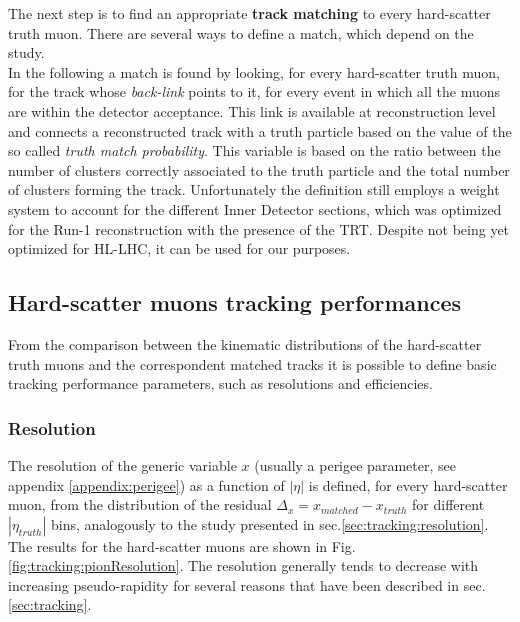 \documentclass[a4paper,twoside,12pt]{article}
\begin{document}
The next step is to find an appropriate \textbf{track matching} to every hard-scatter truth muon. There
are several ways to define a match, which depend on the study. \\

In the following a match is found by looking,
for every hard-scatter truth muon, for the track whose \textit{back-link} points to it, for every event in which all the muons are within
the detector acceptance. This link is available at reconstruction
level and connects a reconstructed track with a truth particle based on the value of the so called \textit{truth match probability}.
This variable is based on the ratio between the number of clusters correctly associated to the truth particle and the total number
of clusters forming the track. Unfortunately the definition still employs a weight system to account for the different Inner Detector sections,
which was optimized for the Run-1 reconstruction with the presence of the TRT. Despite not being yet optimized for HL-LHC, it
can be used for our purposes.

\subsection{Hard-scatter muons tracking performances}
From the comparison between the kinematic distributions of the hard-scatter truth muons and the correspondent matched 
tracks it is possible to define basic tracking performance parameters, such as resolutions and efficiencies. \\

\subsubsection*{Resolution}
The resolution of the generic variable $x$ (usually a perigee parameter, see appendix \ref{appendix:perigee}) as a function of $|\eta|$ is defined, for every hard-scatter muon, from the distribution of the residual 
$\Delta_x = x_{matched} - x_{truth}$ for different $|\eta_{truth}|$ bins, analogously to the study presented in sec.\ref{sec:tracking:resolution}. 
The results for the hard-scatter muons are shown in Fig.\ref{fig:tracking:pionResolution}.
The resolution generally tends to decrease 
with increasing pseudo-rapidity for several reasons that have been described in sec.\ref{sec:tracking}. \\
\end{document}
